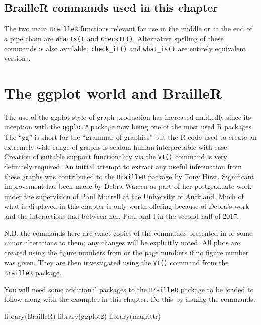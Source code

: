\documentclass[
]{book}
\newenvironment{Shaded}{\begin{snugshade}}{\end{snugshade}}
\newcommand{\FunctionTok}[1]{\textcolor[rgb]{0.00,0.00,0.00}{#1}}
\newcommand{\NormalTok}[1]{#1}
\begin{document}
\hypertarget{brailler-commands-used-in-this-chapter-5}{%
\section{BrailleR commands used in this chapter}\label{brailler-commands-used-in-this-chapter-5}}

The two main \texttt{BrailleR} functions relevant for use in the middle or at the end of a pipe chain are \texttt{WhatIs()} and \texttt{CheckIt()}. Alternative spelling of these commands is also available; \texttt{check\_it()} and \texttt{what\_is()} are entirely equivalent versions.

\hypertarget{GGPlot}{%
\chapter{The ggplot world and BrailleR}\label{GGPlot}}

The use of the ggplot style of graph production has increased markedly since its inception with the \texttt{ggplot2} package \citep{Rpkg-ggplot2} now being one of the most used R packages. The ``gg'' is short for the ``grammar of graphics'' but the R code used to create an extremely wide range of graphs is seldom human-interpretable with ease. Creation of suitable support functionality via the \texttt{VI()} command is very definitely required. An initial attempt to extract any useful infromation from these graphs was contributed to the \texttt{BrailleR} package by Tony Hirst. Significant improvement has been made by Debra Warren as part of her postgraduate work under the supervision of Paul Murrell at the University of Auckland. Much of what is displayed in this chapter is only worth offering because of Debra's work and the interactions had between her, Paul and I in the second half of 2017.

N.B. the commands here are exact copies of the commands presented in \citet{Wickham2009ggplot2} or some minor alterations to them; any changes will be explicitly noted. All plots are created using the figure numbers from \citet{Wickham2009ggplot2} or the page numbers if no figure number was given. They are then investigated using the \texttt{VI()} command from the \texttt{BrailleR} package.

You will need some additional packages to the \texttt{BrailleR} package to be loaded to follow along with the examples in this chapter. Do this by issuing the commands:

\begin{Shaded}
\begin{Highlighting}[]
\FunctionTok{library}\NormalTok{(BrailleR)   }
\FunctionTok{library}\NormalTok{(ggplot2)   }
\FunctionTok{library}\NormalTok{(magrittr)}
\end{Highlighting}
\end{Shaded}
\end{document}
